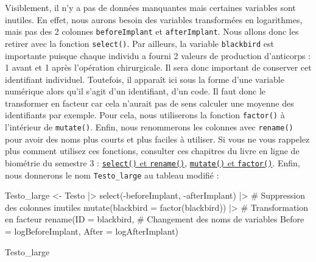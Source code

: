 \documentclass[
  french,
  a4paper,
  DIV=11,
  numbers=noendperiod,
  oneside]{scrreprt}
\newenvironment{Shaded}{}{}
\newcommand{\AttributeTok}[1]{\textcolor[rgb]{0.84,0.23,0.29}{#1}}
\newcommand{\CommentTok}[1]{\textcolor[rgb]{0.42,0.45,0.49}{#1}}
\newcommand{\FunctionTok}[1]{\textcolor[rgb]{0.44,0.26,0.76}{#1}}
\newcommand{\NormalTok}[1]{\textcolor[rgb]{0.14,0.16,0.18}{#1}}
\newcommand{\OtherTok}[1]{\textcolor[rgb]{0.44,0.26,0.76}{#1}}
\newcommand{\SpecialCharTok}[1]{\textcolor[rgb]{0.00,0.36,0.77}{#1}}
\begin{document}
Visiblement, il n'y a pas de données manquantes mais certaines variables
sont inutiles. En effet, nous aurons besoin des variables transformées
en logarithmes, mais pas des 2 colonnes \texttt{beforeImplant} et
\texttt{afterImplant}. Nous allons donc les retirer avec la fonction
\texttt{select()}. Par ailleurs, la variable \texttt{blackbird} est
importante puisque chaque individu a fourni 2 valeurs de production
d'anticorps : 1 avant et 1 après l'opération chirurgicale. Il sera donc
important de conserver cet identifiant individuel. Toutefois, il
apparaît ici sous la forme d'une variable numérique alors qu'il s'agit
d'un identifiant, d'un code. Il faut donc le transformer en facteur car
cela n'aurait pas de sens calculer une moyenne des identifiants par
exemple. Pour cela, nous utiliserons la fonction \texttt{factor()} à
l'intérieur de \texttt{mutate()}. Enfin, nous renommerons les colonnes
avec \texttt{rename()} pour avoir des noms plus courts et plus faciles à
utiliser. Si vous ne vous rappelez plus comment utilisez ces fonctions,
consulter ces chapitres du livre en ligne de biométrie du semestre 3 :
\href{https://besibo.github.io/BiometrieS3/04-DataWrangling.html\#sélectionner-des-variables-avec-select}{\texttt{select()}
et \texttt{rename()}},
\href{https://besibo.github.io/BiometrieS3/04-DataWrangling.html\#mutate}{\texttt{mutate()}
et \texttt{factor()}}. Enfin, nous donnerons le nom
\texttt{Testo\_large} au tableau modifié :

\begin{Shaded}
\begin{Highlighting}[]
\NormalTok{Testo\_large }\OtherTok{\textless{}{-}}\NormalTok{ Testo }\SpecialCharTok{|\textgreater{}} 
  \FunctionTok{select}\NormalTok{(}\SpecialCharTok{{-}}\NormalTok{beforeImplant, }\SpecialCharTok{{-}}\NormalTok{afterImplant) }\SpecialCharTok{|\textgreater{}}  \CommentTok{\# Suppression des colonnes inutiles}
  \FunctionTok{mutate}\NormalTok{(}\AttributeTok{blackbird =} \FunctionTok{factor}\NormalTok{(blackbird)) }\SpecialCharTok{|\textgreater{}}  \CommentTok{\# Transformation en facteur }
  \FunctionTok{rename}\NormalTok{(}\AttributeTok{ID =}\NormalTok{ blackbird,                     }\CommentTok{\# Changement des noms de variables}
         \AttributeTok{Before =}\NormalTok{ logBeforeImplant,}
         \AttributeTok{After =}\NormalTok{ logAfterImplant)}

\NormalTok{Testo\_large}
\end{Highlighting}
\end{Shaded}
\end{document}
